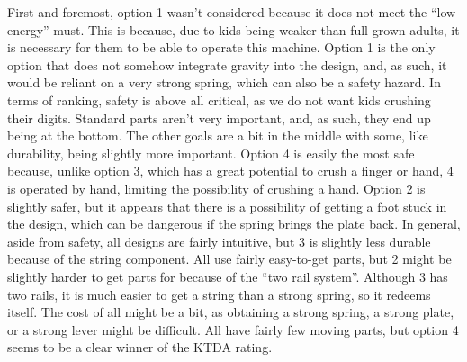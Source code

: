 First and foremost, option 1 wasn't considered because it does not meet the ``low energy'' must. This is because, due to kids being weaker than full-grown adults, it is necessary for them to be able to operate this machine. Option 1 is the only option that does not somehow integrate gravity into the design, and, as such, it would be reliant on a very strong spring, which can also be a safety hazard. In terms of ranking, safety is above all critical, as we do not want kids crushing their digits. Standard parts aren't very important, and, as such, they end up being at the bottom. The other goals are a bit in the middle with some, like durability, being slightly more important. Option 4 is easily the most safe because, unlike option 3, which has a great potential to crush a finger or hand, 4 is operated by hand, limiting the possibility of crushing a hand. Option 2 is slightly safer, but it appears that there is a possibility of getting a foot stuck in the design, which can be dangerous if the spring brings the plate back. In general, aside from safety, all designs are fairly intuitive, but 3 is slightly less durable because of the string component. All use fairly easy-to-get parts, but 2 might be slightly harder to get parts for because of the ``two rail system''. Although 3 has two rails, it is much easier to get a string than a strong spring, so it redeems itself. The cost of all might be a bit, as obtaining a strong spring, a strong plate, or a strong lever might be difficult. All have fairly few moving parts, but option 4 seems to be a clear winner of the KTDA rating.



